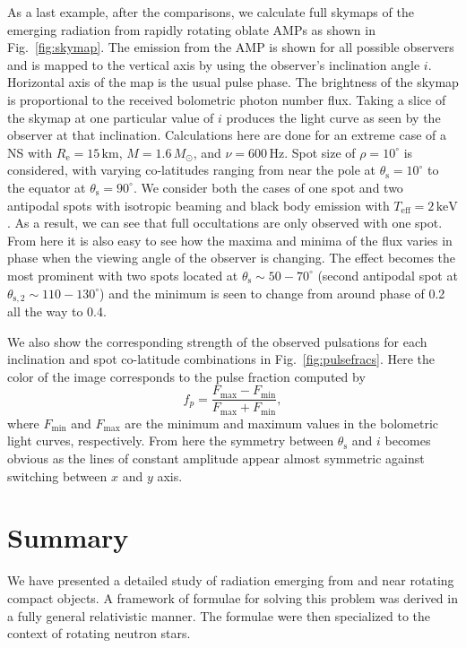 \documentclass{aa}
\newcommand{\be}{\begin{equation}}
\newcommand{\ee}{\end{equation}}
\newcommand{\refe}[1]{#1}
\newcommand{\Msun}{\ensuremath{M_{\odot}}}
\begin{document}
As a last example, after the comparisons, we calculate full skymaps of the emerging radiation from rapidly rotating oblate AMPs as shown in Fig.~\ref{fig:skymap}.
The emission from the AMP is shown for all possible observers and is mapped to the vertical axis by using the observer's inclination angle $i$.
Horizontal axis of the map is the usual pulse phase.
The brightness of the skymap is proportional to the received bolometric photon number flux.
Taking a slice of the skymap at one particular value of $i$ produces the light curve as seen by the observer at that inclination.
Calculations here are done for an extreme case of a NS with $R_{\mathrm{e}} = 15\,\mathrm{km}$, $M=1.6\,\Msun$, and $\nu = 600\,\mathrm{Hz}$.
Spot size of $\rho = 10^{\circ}$ is considered, with varying co-latitudes ranging from near the pole at $\theta_{\mathrm{s}} = 10^{\circ}$ to the equator at $\theta_{\mathrm{s}} = 90^{\circ}$.
We consider both the cases of one spot and two antipodal spots with isotropic beaming and black body emission with $T_{\mathrm{eff}} = 2\,\mathrm{keV}$.
As a result, we can see that full \refe{occultations} are only observed with one spot.
From here it is also easy to see how the maxima and minima of the flux varies in phase when the viewing angle of the observer is changing.
The effect becomes the most prominent with two spots located at $\theta_{\mathrm{s}} \sim 50-70^{\circ}$ (second antipodal spot at $\theta_{\mathrm{s,2}} \sim 110-130^{\circ}$) and the minimum is seen to change from around phase of 0.2 all the way to 0.4.

We also show the corresponding strength of the observed pulsations for each inclination and spot co-latitude combinations in Fig.~\ref{fig:pulsefracs}.
Here the color of the image corresponds to the pulse fraction computed by
\be
f_p = \frac{F_{\mathrm{max}} - F_{\mathrm{min}}}{F_{\mathrm{max}} + F_{\mathrm{min}}},
\ee
where $F_{\mathrm{min}}$ and $F_{\mathrm{max}}$ are the minimum and maximum values in the bolometric light curves, respectively.
From here the symmetry between $\theta_{\mathrm{s}}$ and $i$ becomes obvious as the lines of constant amplitude appear almost symmetric against switching between $x$ and $y$ axis.




\section{Summary}\label{sect:summary}
We have presented a detailed study of radiation emerging from and near rotating compact objects.
A framework of formulae for solving this problem was derived in a fully general relativistic manner. 
The formulae were then specialized to the context of rotating neutron stars.
\end{document}
